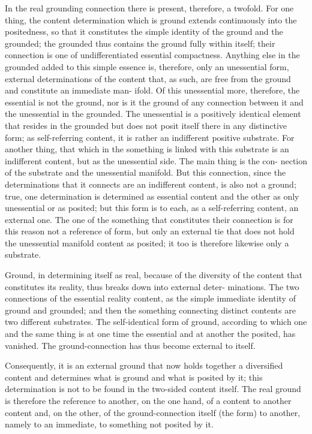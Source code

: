 In the real grounding connection there is present, therefore, a twofold.
For one thing, the content determination which is ground extends
continuously into the positedness, so that it constitutes the simple identity
of the ground and the grounded; the grounded thus contains the ground
fully within itself; their connection is one of undifferentiated essential
compactness. Anything else in the grounded added to this simple essence is,
therefore, only an unessential form, external determinations of the content
that, as such, are free from the ground and constitute an immediate man-
ifold. Of this unessential more, therefore, the essential is not the ground,
nor is it the ground of any connection between it and the unessential in
the grounded. The unessential is a positively identical element that resides
in the grounded but does not posit itself there in any distinctive form;
as self-referring content, it is rather an indifferent positive substrate.  For
another thing, that which in the something is linked with this substrate is an
indifferent content, but as the unessential side. The main thing is the con-
nection of the substrate and the unessential manifold. But this connection,
since the determinations that it connects are an indifferent content, is also
not a ground; true, one determination is determined as essential content
and the other as only unessential or as posited; but this form is to each,
as a self-referring content, an external one. The one of the something that
constitutes their connection is for this reason not a reference of form, but
only an external tie that does not hold the unessential manifold content as
posited; it too is therefore likewise only a substrate.

Ground, in determining itself as real, because of the diversity of the
content that constitutes its reality, thus breaks down into external deter-
minations. The two connections of the essential reality content, as
the simple immediate identity of ground and grounded; and then the
something connecting distinct contents  are two different substrates. The
self-identical form of ground, according to which one and the same thing
is at one time the essential and at another the posited, has vanished. The
ground-connection has thus become external to itself.

Consequently, it is an external ground that now
holds together a diversified content
and determines what is ground and what is posited by it;
this determination is not to be found in the two-sided content itself.
The real ground is therefore the reference to another,
on the one hand, of a content to another content
and, on the other, of the ground-connection itself
(the form) to another, namely to an immediate,
to something not posited by it.

